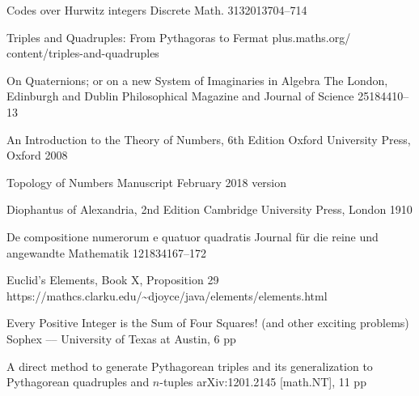 \documentclass[12pt,table]{article}
\theoremstyle{definition}
\theoremstyle{remark}
\numberwithin{equation}{section}
\begin{document}
\begin{thebibliography}{1}
        {Codes over Hurwitz integers}
        {Discrete Math.}
        {313}{2013}{704--714}



      {Triples and Quadruples: From Pythagoras to Fermat}
      {plus.maths.org/ content/triples-and-quadruples}{}

        {On Quaternions; or on a new System of Imaginaries in Algebra}
        {The London, Edinburgh and Dublin Philosophical Magazine
         and Journal of Science}
        {25}{1844}{10--13}


         {An Introduction to the Theory of Numbers, 6th Edition}
         {Oxford University Press, Oxford} 
         {2008}




         {Topology of Numbers}
         {Manuscript}
         {February 2018 version}



     {Diophantus of Alexandria, 2nd Edition}
     {Cambridge University Press, London}
     {1910}

\begin{comment}

\bibitem{Hurwitz}
\journal{A.\ Hurwitz}
        {\"Uber die Komposition der quadratischen Formen}
        {Mathematische Annalen}
        {88}{1922}{1--25}

\end{comment}


        {De compositione numerorum e quatuor quadratis}
        {Journal f\"ur die reine und angewandte Mathematik}
        {12}{1834}{167--172}

        {Euclid's Elements, Book X, Proposition 29}
        {\\https://mathcs.clarku.edu/\~{}djoyce/java/elements/elements.html}



      {Every Positive Integer is the Sum of Four Squares! (and other
      exciting problems)} 
      {Sophex –-- University of Texas at Austin, 6
      pp}{}

\begin{comment}

\bibitem{Mordell}
\book{L.\ J.\ Mordell}
         {Diophantine Equations}
         {Academic Press, London and New York} 
         {1969}

\end{comment}


      {A direct method to generate Pythagorean triples and its
       generalization to Pythagorean quadruples and $n$-tuples}
      {arXiv:1201.2145 [math.NT], 11 pp}



\end{thebibliography}
\end{document}

